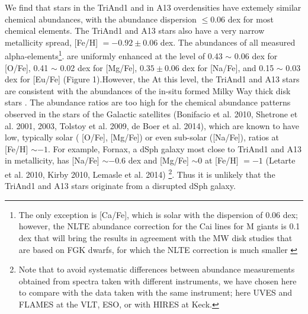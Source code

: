 \documentclass[galaxies,article,submit,moreauthors,pdftex,10pt,a4paper]{mdpi}
\newcommand{\ion}[1]{#1}
\begin{document}
We find that stars in the TriAnd1 and in A13 overdensities have extemely similar chemical abundances, with the abundance dispersion $\leq 0.06$ dex for most chemical elements. The TriAnd1 and A13 stars also have a very narrow metallicity spread,  [Fe/H] $= -0.92 \pm 0.06$ dex. The abundances of all measured alpha-elements\footnote{The only exception is [Ca/Fe], which is solar with the dispersion of 0.06 dex; however, the NLTE abundance correction for the \ion{Ca}{i} lines for M giants is 0.1 dex that will bring the results in agreement with the MW disk studies that are based on FGK dwarfs, for which the NLTE correction is much smaller \cite{Merle2011}}. are uniformly enhanced at the level of 0.43 $\sim$ 0.06 dex for [O/Fe], 0.41 $\sim$ 0.02 dex for [Mg/Fe], $0.35 \pm 0.06$ dex for [Na/Fe], and 0.15 $\sim$ 0.03 dex for [Eu/Fe] (Figure 1).However, the At this level, the TriAnd1 and A13 stars are consistent with the abundances of the in-situ formed Milky Way thick disk stars \cite{fuhrmann2002,bergemann2014,bensby2014}. The abundance ratios are too high for the chemical abundance patterns observed in the stars of the Galactic satellites (Bonifacio et al. 2010, Shetrone et al. 2001, 2003, Tolstoy et al. 2009, de Boer et al. 2014), which are known to have low, typically solar ( [O/Fe], [Mg/Fe]) or even sub-solar ([Na/Fe]), ratios at [Fe/H] $\sim -1$. For example, Fornax, a dSph galaxy most close to TriAnd1 and A13 in metallicity, has [Na/Fe] $\sim -0.6$ dex and [Mg/Fe] $\sim 0$ at [Fe/H] $=-1$ (Letarte et al. 2010, Kirby 2010, Lemasle et al. 2014) \footnote{Note that to avoid systematic differences between abundance measurements obtained from spectra taken with different instruments, we have chosen here to compare with the data taken with the same instrument; here UVES and FLAMES at the VLT, ESO, or with HIRES at Keck.}. Thus it is unlikely that the TriAnd1 and A13 stars originate from a disrupted dSph galaxy.
\end{document}
